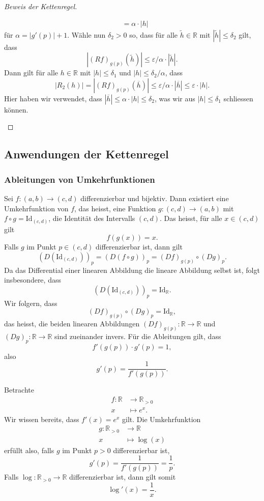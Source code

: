 \documentclass[../main.tex]{subfiles}
\begin{document}
\begin{proof}[Beweis der Kettenregel]
\begin{enumerate}[(1)]
\begin{align*}
         &= \alpha \cdot |h|
      \end{align*}
      für $\alpha = |g'(p)| + 1$.
      Wähle nun $\delta_2 > 0$ so,
      dass für alle $\widetilde h \in \mathbb{R}$ 
      mit $|\widetilde h| \leq \delta_2$ gilt,
      dass
      \[
        |{(Rf)}_{g(p)}(\widetilde h)| \leq \varepsilon/\alpha
        \cdot |\widetilde h|.
      \]
      Dann gilt für alle $h \in \mathbb{R}$ mit
      $|h| \leq \delta_1$ und $|h| \leq \delta_2/\alpha$,
      dass
      \[
        |R_2(h)| = |{(Rf)}_{g(p)}(\overline h)|
        \leq \varepsilon/\alpha \cdot |\overline h| \leq
        \varepsilon \cdot |h|.
      \]
      Hier haben wir verwendet, dass
      $|\overline h| \leq \alpha \cdot |h| \leq \delta_2$,
      was wir aus $|h| \leq \delta_1$ schliessen
      können. \qedhere
  \end{enumerate}
\end{proof}

\subsection*{Anwendungen der Kettenregel}
\subsubsection*{Ableitungen von Umkehrfunktionen}
Sei $f \colon (a, b) \to (c, d)$ 
differenzierbar und bijektiv.
Dann existiert eine Umkehrfunktion
von $f$, das heisst, eine Funktion
$g \colon (c, d) \to (a, b)$ 
mit $f \circ g = \text{Id}_{(c, d)}$,
die Identität des Intervalls
$(c, d)$. Das heisst, für alle
$x \in (c, d)$ gilt
\[
  f(g(x)) = x.
\]
Falls $g$ im Punkt $p \in (c, d)$
differenzierbar ist, dann gilt
\[
  {(D(\text{Id}_{(c, d)}))}_{p} = 
  {(D(f \circ g))}_p
  = {(Df)}_{g(p)} \circ {(Dg)}_p.
\]
Da das Differential einer linearen Abbildung
die lineare Abbildung selbst ist,
folgt insbesondere, dass
\[
  {(D(\text{Id}_{(c, d)}))}_p = \text{Id}_{\mathbb{R}}.
\]
Wir folgern, dass
\[
  {(Df)}_{g(p)} \circ {(Dg)}_p = \text{Id}_{\mathbb{R}},
\]
das heisst, die beiden linearen Abbildungen
${(Df)}_{g(p)} \colon \mathbb{R} \to \mathbb{R}$
und ${(Dg)}_p \colon \mathbb{R} \to \mathbb{R}$ 
sind zueinander invers.
Für die Ableitungen gilt, dass
\[
  f'(g(p)) \cdot g'(p) = 1,
\]
also
\[
  g'(p) = \frac{1}{f'(g(p))}.
\]

\begin{example}
Betrachte
\begin{align*}
  f \colon \mathbb{R} & \to \mathbb{R}_{>0} \\
  x & \mapsto e^x.
\end{align*}
Wir wissen bereits, dass $f'(x) = e^x$ gilt.
Die Umkehrfunktion
\begin{align*}
  g \colon \mathbb{R}_{>0} & \to \mathbb{R} \\
  x & \mapsto \log(x)
\end{align*}
erfüllt also, falls $g$ im Punkt $p > 0$ differenzierbar ist,
\[
  g'(p) = \frac{1}{f'(g(p))} = \frac{1}{p}.
\]
Falls $\log \colon \mathbb{R}_{>0} \to \mathbb{R}$ 
differenzierbar ist, dann gilt somit
\[
  \log'(x) = \frac{1}{x}.
\]
\end{example}
      
\end{document}
